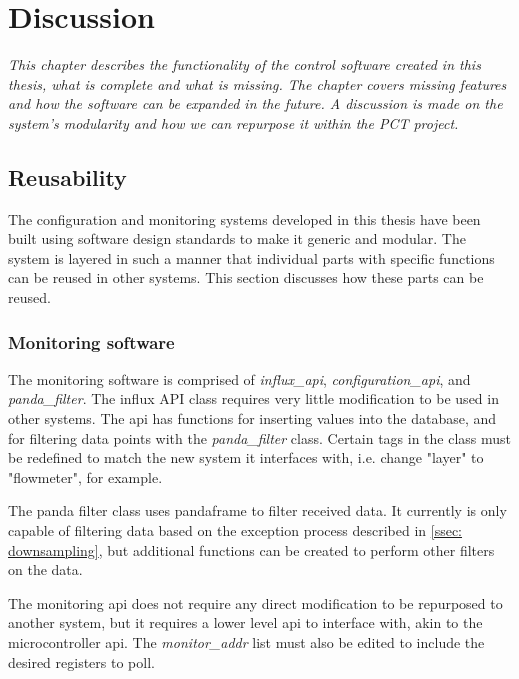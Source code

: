 \documentclass[main.tex]{subfiles}
\begin{document}

\section{Discussion}
\textit{This chapter describes the functionality of the control software created in this thesis, what is complete and what is missing. The chapter covers missing features and how the software can be expanded in the future. A discussion is made on the system's modularity and how we can repurpose it within the PCT project.}

\subsection{Reusability}
 
 The configuration and monitoring systems developed in this thesis have been built using software design standards to make it generic and modular. The system is layered in such a manner that individual parts with specific functions can be reused in other systems. This section discusses how these parts can be reused.
 
 \subsubsection{Monitoring software}
The monitoring software is comprised of \textit{influx\_api}, \textit{configuration\_api}, and \textit{panda\_filter}. The influx API class requires very little modification to be used in other systems. The \gls{api} has functions for inserting values into the database, and for filtering data points with the \textit{panda\_filter} class. Certain tags in the class must be redefined to match the new system it interfaces with, i.e. change "layer" to "flowmeter", for example.

The panda filter class uses pandaframe to filter received data. It currently is only capable of filtering data based on the exception process described in \autoref{ssec: downsampling}, but additional functions can be created to perform other filters on the data.

The monitoring \gls{api} does not require any direct modification to be repurposed to another system, but it requires a lower level \gls{api} to interface with, akin to the microcontroller \gls{api}. The \textit{monitor\_addr} list must also be edited to include the desired registers to poll.
\end{document}
